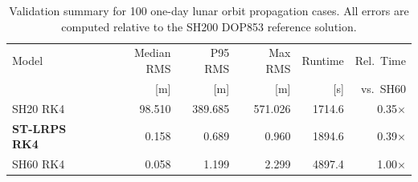 \begin{table}[htbp]
\centering
\caption{Validation summary for 100 one-day lunar orbit propagation cases.
All errors are computed relative to the SH200 DOP853 reference solution.}
\label{tab:validation_summary}
\begin{tabular}{l r r r r r}
\toprule
Model & Median RMS & P95 RMS & Max RMS & Runtime & Rel.\ Time \\
      & {[m]}      & {[m]}   & {[m]}   & {[s]}   & {vs.\ SH60} \\
\midrule
SH20 RK4 & 98.510 & 389.685 & 571.026 & 1714.6 & 0.35$\times$ \\
\textbf{ST-LRPS RK4} & 0.158 & 0.689 & 0.960 & 1894.6 & 0.39$\times$ \\
SH60 RK4 & 0.058 & 1.199 & 2.299 & 4897.4 & 1.00$\times$ \\
\bottomrule
\end{tabular}
\end{table}

